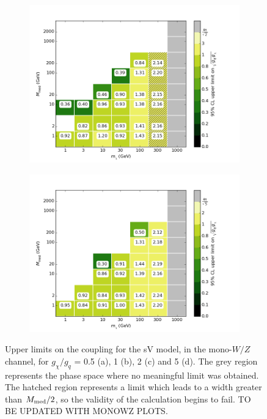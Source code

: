 \begin{figure}[h]
\begin{subfigure}[t]{0.45\textwidth}
      \includegraphics[width=1.\textwidth]{figures/grid_allpoints_SVD_rat2.png}
      \caption{}
    \end{subfigure}
    \begin{subfigure}[t]{0.45\textwidth}
      \centering
      \includegraphics[width=1.\textwidth]{figures/grid_allpoints_SVD_rat5.png}
      \caption{}
    \end{subfigure}
    \caption{Upper limits on the coupling for the sV model, in the mono-$W/Z$ channel, for $g_{\chi} / g_q$ = 0.5 (a), 1 (b), 2 (c) and 5 (d). The grey region represents the phase space where no meaningful limit was obtained. The hatched region represents a limit which leads to a width greater than $M_{\mathrm{med}} / 2$, so the validity of the calculation begins to fail. TO BE UPDATED WITH MONOWZ PLOTS.}
    \label{fig:MonoWZ_SVD_couplinglimit}
\end{figure}

